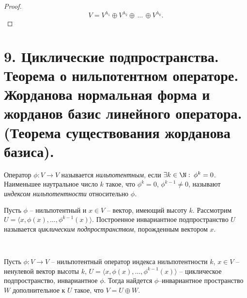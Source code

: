\begin{proof}
    $$V = V^{\lambda_1} \oplus V^{\lambda_2} \oplus \, \dots \, \oplus V^{\lambda_k}.$$
\end{proof}

\section{9. Циклические подпространства. Теорема о нильпотентном операторе. Жорданова нормальная форма и жорданов базис линейного оператора. (Теорема существования жорданова базиса).}

\begin{definition}
    Оператор $\phi: V \to V$ называется \textit{нильпотентным}, если $\exists k \in \N :\: \phi^k = 0$. Наименьшее наутральное число $k$ такое, что $\phi^k = 0$, $\phi^{k-1} \neq 0$, называют \textit{индексом нильпотентности} относительно $\phi$. 
\end{definition}

\begin{definition}
    Пусть $\phi$ -- нильпотентный и $x \in V$ -- вектор, имеющий высоту $k$. 
    Рассмотрим $U = \langle x, \phi(x), \ldots, \phi^{k-1}(x)\rangle$.
    Построенное инвариантное подпространство $U$ называется \textit{циклическим подпространством}, 
    порожденным вектором $x$.
\end{definition}

\begin{theorem}~
    \label{th5.3}

    Пусть $\phi: V \to V$ -- нильпотентный оператор индекса нильпотентности $k$, $x \in V$ -- ненулевой вектор высоты $k$,
    $U = \langle x, \phi(x), \ldots, \phi^{k-1}(x) \rangle$ -- циклическое подпространство, инвариантное $\phi$.
    Тогда найдется $\phi$--инвариантное пространство $W$ дополнительное к $U$ такое, что $V = U \oplus W$.
\end{theorem}


